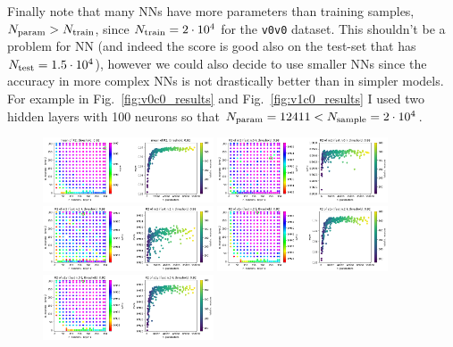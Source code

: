 \documentclass[prd,aps,twocolumn,a4paper,showkeys,nofootinbib]{revtex4-1}
\begin{document}
Finally note that many NNs have more parameters than training samples, 
$N_{\rm param}>N_{\rm train}$, since 
$N_{\rm train}=2\cdot 10^4$ for the \texttt{v0v0} dataset. This shouldn't be a problem 
for NN (and indeed the score is good also on the test-set that has 
$N_{\rm test}=1.5\cdot 10^4$), however we could also decide to use smaller NNs 
since the accuracy in more complex NNs is not drastically better than in simpler models. 
For example in Fig.~\ref{fig:v0c0_results} and Fig.~\ref{fig:v1c0_results} I used
two hidden layers with 100 neurons so that $N_{\rm param}=12411<N_{\rm sample}=2\cdot 10^4$.

%
\begin{figure}[]
  \center
  \includegraphics[width=0.45\textwidth]{./Figs/crossval_v0c0_R2mean.png}
  \hspace{0.3cm}
  \includegraphics[width=0.45\textwidth]{./Figs/crossval_v0c0_R2m1.png} \\
  \includegraphics[width=0.45\textwidth]{./Figs/crossval_v0c0_R2m2.png}
  \hspace{0.3cm}
  \includegraphics[width=0.45\textwidth]{./Figs/crossval_v0c0_R2s1x.png} \\
  \includegraphics[width=0.45\textwidth]{./Figs/crossval_v0c0_R2s1y.png}

\end{figure}
\end{document}

